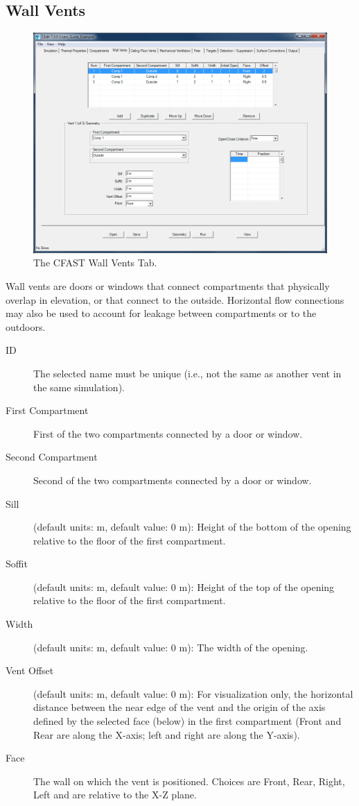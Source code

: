 \subsection{Wall Vents}
\label{info:VENT}
\begin{figure}[h!]
\begin{center}
\includegraphics[width=6.5in]{FIGURES/Natural_Flow_Tab}
\caption[The CFAST Wall Vents Tab]{The CFAST Wall Vents Tab.}
\end{center}
\end{figure}

Wall vents are doors or windows that connect compartments that physically overlap in elevation, or that connect to the outside. Horizontal flow connections may also be used to account for leakage between compartments or to the outdoors.

\begin{description}
\item[ID] The selected name must be unique (i.e., not the same as another vent in the same simulation).
\item[First Compartment] First of the two compartments connected by a door or window.
\item[Second Compartment] Second of the two compartments connected by a door or window.
\item[Sill] (default units: m, default value: 0 m): Height of the bottom of the opening relative to the floor of the first compartment.
\item[Soffit] (default units: m, default value: 0 m): Height of the top of the opening relative to the floor of the first compartment.
\item[Width] (default units: m, default value: 0 m): The width of the opening.
\item[Vent Offset] (default units: m, default value: 0 m): For visualization only, the horizontal distance between the near edge of the vent and the origin of the axis defined by the selected face (below) in the first compartment (Front and Rear are along the X-axis; left and right are along the Y-axis).
\item[Face] The wall on which the vent is positioned.  Choices are Front, Rear, Right, Left and are relative to the X-Z plane.
\end{description}

